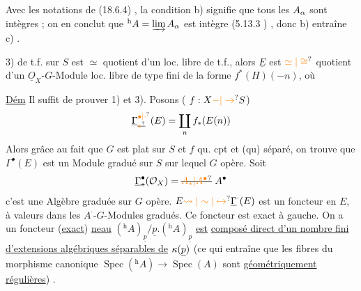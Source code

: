 Avec les notations de (18.6.4) , la condition b) signifie
que tous les $A_{\alpha}$ sont intègres ;  on en conclut que $ {}^{\mathrm h}A=\varinjlim A_{\alpha}$ est intègre (5.13.3 ) , donc b) entraîne
c) .

3) 
de t.f. sur $S$ est $\simeq$ quotient d'un loc. libre de t.f.,
 alors $\underline E$ est $\unsure{\simeq|\cong}$ quotient d'un
$\underline O_X$-$G$-Module loc. libre de type fini
de la forme $f^*(H)(-n)$, où

\uline{Dém} Il suffit de prouver 1) et 3). Posons
( $f:X\unsure{-|\to}S$)
\[
\underline{\Gamma}_{\deleted{\unsure{*}}}^{\unsure{\bullet|\cdot}}(E)=\coprod_n f_*(E(n))
\]
Alors grâce au fait que $G$ est plat sur $S$
et $f$ qu. cpt et (qu) séparé, on trouve que
$\Gamma^\bullet(E)$ est un Module gradué sur $S$ sur
lequel $G$ opère. Soit
\[
\underline{\Gamma}_{\deleted{*}}^\bullet(\mathcal O_X)=\deleted{\unsure{A_*|A^\bullet}}\ A^\bullet
\]
c'est une Algèbre graduée sur 
$G$ opère. $E\unsure{\leadsto|\sim|\mapsto}\underline{\Gamma}^{\cdot}(E)$ est un foncteur en
$E$, à valeurs dans les 
$A^{\cdot}$-$G$-Modules gradués. Ce foncteur
est exact à gauche. On a un foncteur
(\uline{exact})
\uline{neau} $({}^{\mathrm h}A)_{\underline p}/\underline p.({}^{\mathrm h}A)_{\underline p}$ \uline{est}  \uline{composé direct d'un nombre fini d'extensions
algébriques séparables de} $\kappa(\underline p)$ (ce qui entraîne que les fibres du morphisme
canonique $\operatorname{Spec}({}^{\mathrm h}A)\to\operatorname{Spec}(A)$ sont \uline{géométriquement régulières}) .

